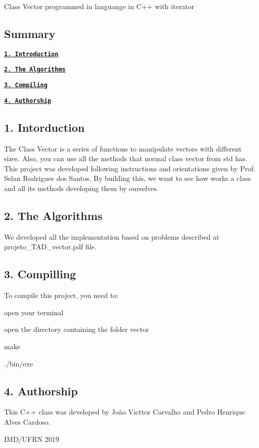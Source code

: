 Class Vector programmed in languange in C++ with iterator

\subsection*{Summary}

{\bfseries \href{#1-introduction}{\tt 1. Introduction}}

{\bfseries \href{#2-the-algorithms}{\tt 2. The Algorithms}}

{\bfseries \href{#3-compiling}{\tt 3. Compiling}}

{\bfseries \href{#4-authorship}{\tt 4. Authorship}}

\subsection*{1. Intorduction}

The Class Vector is a series of functions to manipulate vectors with different sizes. Also, you can use all the methods that normal class vector from std has. This project was developed following instructions and orientations given by Prof. Selan Rodrigues dos Santos. By building this, we want to see how works a class and all its methods developing them by ourselves.

\subsection*{2. The Algorithms}

We developed all the implementation based on problems described at {\ttfamily projeto\+\_\+\+T\+A\+D\+\_\+vector.\+pdf} file.

\subsection*{3. Compilling}

To compile this project, you need to\+:

{\ttfamily open your terminal}

{\ttfamily open the directory containing the folder vector}

{\ttfamily make}

{\ttfamily ./bin/exe}

\subsection*{4. Authorship}

This C++ class was developed by João Victtor Carvalho and Pedro Henrique Alves Cardoso.

I\+M\+D/\+U\+F\+RN 2019 